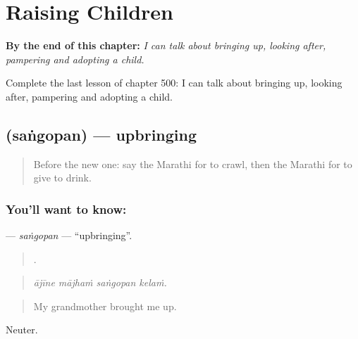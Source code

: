 
\chapter{Raising Children}
\label{ch:mr-raising-children}

\begin{chapteropening}
\textbf{By the end of this chapter:} \emph{I can talk about bringing up, looking after, pampering and adopting a child.}

Complete the last lesson of chapter 500: I can talk about bringing up, looking after, pampering and adopting a child.
\end{chapteropening}

\section[\texorpdfstring{\mr{संगोपन} (saṅgopan)}{संगोपन (saṅgopan)}]{ (saṅgopan) — upbringing}

\label{lesson:MR-C500-sangopan}



\begin{quote}
Before the new one: say the Marathi for to crawl, then the Marathi for to give to drink.
\end{quote}

\subsection*{You'll want to know: }
\textbf{} — \emph{saṅgopan} — \textquotedblleft{}upbringing\textquotedblright{}.

\begin{quote}
   .
\end{quote}

\begin{quote}
\emph{ājīne mājhaṁ saṅgopan kelaṁ.}
\end{quote}

\begin{quote}
My grandmother brought me up.
\end{quote}

Neuter.

